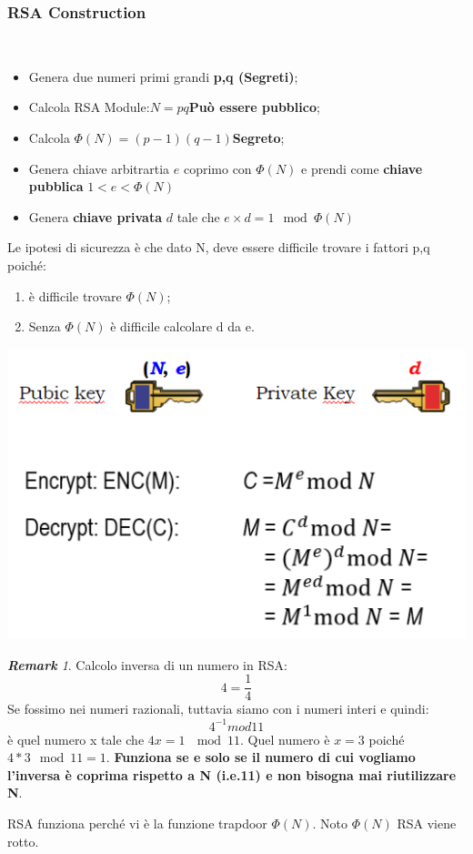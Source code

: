 \documentclass{book}
\theoremstyle{remark}
\newtheorem*{remark}{\textbf{Remark}}
\begin{document}
\subsubsection{RSA Construction}\mbox{}\\
\begin{itemize}
	\item Genera due numeri primi grandi \textbf{p,q (Segreti)};\@
	\item Calcola RSA Module:\@\(N=pq\)\textbf{Può essere pubblico};\@
	\item Calcola \(\Phi(N)=(p-1)(q-1)\)\textbf{Segreto};\@
	\item Genera chiave arbitrartia \(e\) coprimo con \(\Phi(N)\) e prendi come \textbf{chiave pubblica} \(1<e<\Phi(N)\)
	\item Genera \textbf{chiave privata} \(d\) tale che \(e\times d=1\mod{\Phi(N)}\)
\end{itemize}
Le ipotesi di sicurezza è che dato N, deve essere difficile trovare i fattori p,q poiché:\begin{enumerate}
	\item è difficile trovare \(\Phi(N)\);\@
	\item Senza \(\Phi(N)\) è difficile calcolare d da e\@.
\end{enumerate}
\begin{center}
	\includegraphics[scale=0.6]{2021-12-04-17-21-53.png}
\end{center}
\begin{remark}
	Calcolo inversa di un numero in RSA:
	\begin{equation}
		4=\frac{1}{4}
	\end{equation}
	Se fossimo nei numeri razionali, tuttavia siamo con i numeri interi e quindi:
	\begin{equation}
		4^{-1}mod 11
	\end{equation}
	è quel numero x tale che \(4x=1\ \mod{11}\)\@.\newline
	Quel numero è \(x=3\) poiché \(4*3 \mod{11}=1\)\@. \newline
	\textbf{Funziona se e solo se il numero di cui vogliamo l'inversa è coprima rispetto a N (i\@.e\@.11) e non bisogna mai riutilizzare N}\@.
\end{remark}
RSA funziona perché vi è la funzione trapdoor \(\Phi(N)\)\@. Noto \(\Phi(N)\) RSA viene rotto\@.
\end{document}
